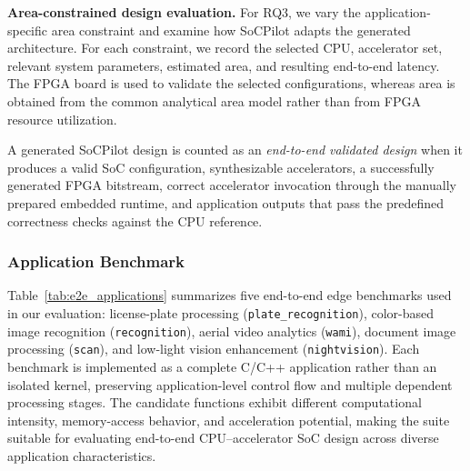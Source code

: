 \textbf{Area-constrained design evaluation.}
For RQ3, we vary the application-specific area constraint and examine how SoCPilot adapts the generated architecture. For each constraint, we record the selected CPU, accelerator set, relevant system parameters, estimated area, and resulting end-to-end latency. The FPGA board is used to validate the selected configurations, whereas area is obtained from the common analytical area model rather than from FPGA resource utilization.

A generated SoCPilot design is counted as an \emph{end-to-end validated design} when it produces a valid SoC configuration, synthesizable accelerators, a successfully generated FPGA bitstream, correct accelerator invocation through the manually prepared embedded runtime, and application outputs that pass the predefined correctness checks against the CPU reference.

\subsubsection{Application Benchmark}
\label{subsec:application_suite}
Table~\ref{tab:e2e_applications} summarizes five end-to-end edge benchmarks used in our evaluation: license-plate processing (\texttt{plate\_recognition}), color-based image recognition (\texttt{recognition}), aerial video analytics (\texttt{wami}), document image processing (\texttt{scan}), and low-light vision enhancement (\texttt{nightvision}). Each benchmark is implemented as a complete C/C++ application rather than an isolated kernel, preserving application-level control flow and multiple dependent processing stages. The candidate functions exhibit different computational intensity, memory-access behavior, and acceleration potential, making the suite suitable for evaluating end-to-end CPU--accelerator SoC design across diverse application characteristics.

